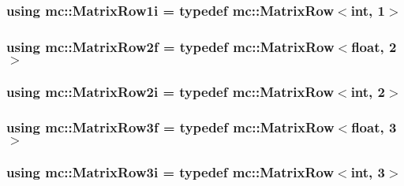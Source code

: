 \subsubsection[{\texorpdfstring{Matrix\+Row1i}{MatrixRow1i}}]{\setlength{\rightskip}{0pt plus 5cm}using {\bf mc\+::\+Matrix\+Row1i} = typedef {\bf mc\+::\+Matrix\+Row}$<${\bf int}, 1$>$}\hypertarget{namespacemc_a93694e95604472a1c26070b1b70990cb}{}\label{namespacemc_a93694e95604472a1c26070b1b70990cb}
\subsubsection[{\texorpdfstring{Matrix\+Row2f}{MatrixRow2f}}]{\setlength{\rightskip}{0pt plus 5cm}using {\bf mc\+::\+Matrix\+Row2f} = typedef {\bf mc\+::\+Matrix\+Row}$<$float, 2$>$}\hypertarget{namespacemc_a3b4a3205e212db1db4bc8e47fe4cc312}{}\label{namespacemc_a3b4a3205e212db1db4bc8e47fe4cc312}
\subsubsection[{\texorpdfstring{Matrix\+Row2i}{MatrixRow2i}}]{\setlength{\rightskip}{0pt plus 5cm}using {\bf mc\+::\+Matrix\+Row2i} = typedef {\bf mc\+::\+Matrix\+Row}$<${\bf int}, 2$>$}\hypertarget{namespacemc_a668aec14caead769bdd4d7066e8e15fe}{}\label{namespacemc_a668aec14caead769bdd4d7066e8e15fe}
\subsubsection[{\texorpdfstring{Matrix\+Row3f}{MatrixRow3f}}]{\setlength{\rightskip}{0pt plus 5cm}using {\bf mc\+::\+Matrix\+Row3f} = typedef {\bf mc\+::\+Matrix\+Row}$<$float, 3$>$}\hypertarget{namespacemc_a8b0d875a0b758d1b6ca600bfca37f1b9}{}\label{namespacemc_a8b0d875a0b758d1b6ca600bfca37f1b9}
\subsubsection[{\texorpdfstring{Matrix\+Row3i}{MatrixRow3i}}]{\setlength{\rightskip}{0pt plus 5cm}using {\bf mc\+::\+Matrix\+Row3i} = typedef {\bf mc\+::\+Matrix\+Row}$<${\bf int}, 3$>$}\hypertarget{namespacemc_a3ed70e2494e81425a982a4d7abedb1b8}{}\label{namespacemc_a3ed70e2494e81425a982a4d7abedb1b8}

